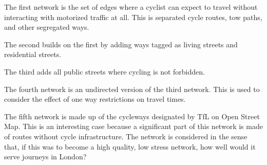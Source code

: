 \documentclass[11pt]{article} %
\begin{document}
The first network is the set of edges where a cyclist can expect to travel without interacting with motorized traffic at all. This is separated cycle routes, tow paths, and other segregated ways. 

The second builds on the first by adding ways tagged as living streets and residential streets.

The third adds all public streets where cycling is not forbidden. 

The fourth network is an undirected version of the third network. This is used to consider the effect of one way restrictions on travel times. 

The fifth network is made up of the cycleways designated by TfL on Open Street Map. This is an interesting case because a significant part of this network is made of routes without cycle infrastructure. The network is considered in the sense that, if this was to become a high quality, low stress network, how well would it serve journeys in London? 
\end{document}

